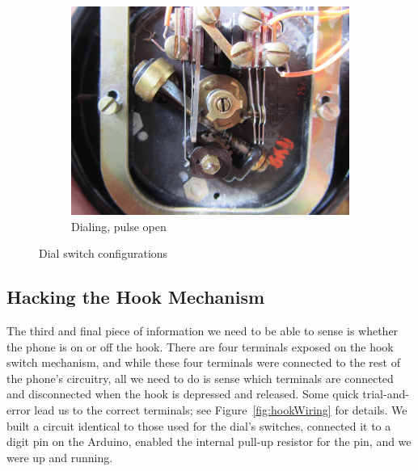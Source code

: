 \documentclass{es50report}
\begin{document}
\begin{figure}
        \begin{subfigure}[b]{0.47\textwidth}
                \includegraphics[width=\textwidth, clip=true, trim=300 250 300 70]{images/small/dialPulse}
                \caption{Dialing, pulse open}
                \label{fig:dialPulse}
        \end{subfigure}
        \caption{Dial switch configurations}\label{fig:dialState}
    \end{figure}

    \subsection{Hacking the Hook Mechanism}
    The third and final piece of information we need to be able to sense is whether the phone is on or off the hook. There are four terminals exposed on the hook switch mechanism, and while these four terminals were connected to the rest of the phone's circuitry, all we need to do is sense which terminals are connected and disconnected when the hook is depressed and released. Some quick trial-and-error lead us to the correct terminals; see Figure~\ref{fig:hookWiring} for details. We built a circuit identical to those used for the dial's switches, connected it to a digit pin on the Arduino, enabled the internal pull-up resistor for the pin, and we were up and running.
\end{document}
